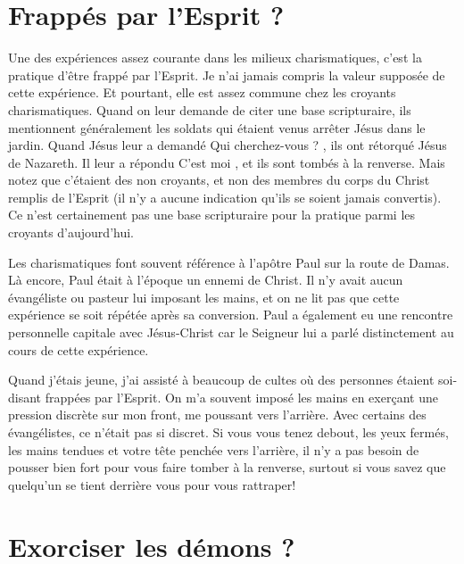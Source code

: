 \section{Frapp\'es par l'Esprit ?}

Une des expériences assez courante dans les milieux charismatiques,
 c'est la pratique d'être \Og frappé par l'Esprit. \Fg{}
 Je n'ai jamais compris la valeur supposée de cette expérience.
 Et pourtant, elle est assez commune chez les croyants charismatiques.
 Quand on leur demande de citer une base scripturaire,
 ils mentionnent généralement les soldats qui étaient venus arrêter
 Jésus dans le jardin. Quand Jésus leur a demandé\frcolon{}
 \Og Qui cherchez-vous ? \Fg{}, ils ont rétorqué\frcolon{}
 \Og Jésus de Nazareth. \Fg{} Il leur a répondu\frcolon{}
 \Og C'est moi \Fg{}, et ils sont tombés à la renverse.
 Mais notez que c'étaient des non croyants, et non des membres
 du corps du Christ remplis de l'Esprit (il n'y a aucune indication
 qu'ils se soient jamais convertis). Ce n'est certainement pas une base
 scripturaire pour la pratique parmi les croyants d'aujourd'hui.

Les charismatiques font souvent référence à l'apôtre Paul sur la route
 de Damas. Là encore, Paul était à l'époque un ennemi de Christ.
 Il n'y avait aucun évangéliste ou pasteur lui imposant les mains,
 et on ne lit pas que cette expérience se soit répétée après sa conversion.
 Paul a également eu une rencontre personnelle capitale avec Jésus-Christ
 car le Seigneur lui a parlé distinctement au cours de cette expérience.

Quand j'étais jeune, j'ai assisté à beaucoup de cultes où des personnes
 étaient soi-disant frappées par l'Esprit.
 On m'a souvent imposé les mains
 en exerçant une pression discrète sur mon front,
 me poussant vers l'arrière. Avec certains des évangélistes,
 ce n'était pas si discret. Si vous vous tenez debout, les yeux fermés,
 les mains tendues et votre tête penchée vers l'arrière,
 il n'y a pas besoin de pousser bien fort pour vous faire tomber
 à la renverse, surtout si vous savez que quelqu'un se tient derrière
 vous pour vous rattraper!
 \nowidow[5]


\section{Exorciser les d\'emons ?}

